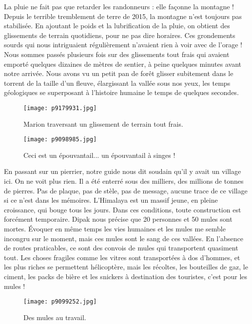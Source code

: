 \documentclass{book}
\begin{document}
La pluie ne fait pas que retarder les randonneurs : elle façonne la montagne ! Depuis le terrible tremblement de terre de 2015, la montagne n'est toujours pas stabilisée. En ajoutant le poids et la lubrification de la pluie, on obtient des glissements de terrain quotidiens, pour ne pas dire horaires. Ces grondements sourds qui nous intriguaient régulièrement n'avaient rien à voir avec de l'orage ! Nous sommes passés plusieurs fois sur des glissements tout frais qui avaient emporté quelques dizaines de mètres de sentier, à peine quelques minutes avant notre arrivée. Nous avons vu un petit pan de forêt glisser subitement dans le torrent de la taille d'un fleuve, élargissant la vallée sous nos yeux, les temps géologiques se superposant à l'histoire humaine le temps de quelques secondes.


\begin{figure}[h]
\centering
\texttt{[image: p9179931.jpg]}
\caption*{Marion traversant un glissement de terrain tout frais.}
\end{figure}


\begin{figure}[h]
\centering
\texttt{[image: p9098985.jpg]}
\caption*{Ceci est un épouvantail... un épouvantail à singes !}
\end{figure}

En passant sur un pierrier, notre guide nous dit soudain qu'il y avait un village ici. On ne voit plus rien. Il a été enterré sous des milliers, des millions de tonnes de pierres. Pas de plaque, pas de stèle, pas de message, aucune trace de ce village si ce n'est dans les mémoires. L'Himalaya est un massif jeune, en pleine croissance, qui bouge tous les jours. Dans ces conditions, toute construction est forcément temporaire. Dipak nous précise que 20 personnes et 50 mules sont mortes. Évoquer en même temps les vies humaines et les mules me semble incongru sur le moment, mais ces mules sont le sang de ces vallées. En l'absence de routes praticables, ce sont des convois de mules qui transportent quasiment tout. Les choses fragiles comme les vitres sont transportées à dos d'hommes, et les plus riches se permettent hélicoptère, mais les récoltes, les bouteilles de gaz, le ciment, les packs de bière et les snickers à destination des touristes, c'est pour les mules !


\begin{figure}[h]
\centering
\texttt{[image: p9099252.jpg]}
\caption*{Des mules au travail.}
\end{figure}
\end{document}
